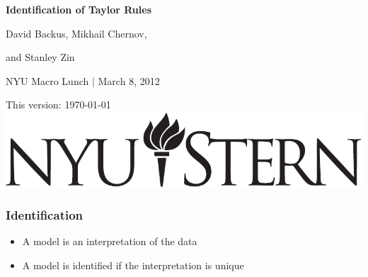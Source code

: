 \documentclass{beamer}
\title[Identification]{}
\author[Backus, Chernov, \& Zin]{}
\institute[NYU, LSE]{}
\date[]{\today}
\begin{document}
\vspace*{0.85in}
\centerline{\Large\bf Identification of Taylor Rules}

\bigskip\bigskip\bigskip\medskip
\centerline{David Backus, Mikhail Chernov,}
\centerline{and Stanley Zin}

\bigskip\medskip\medskip\medskip
\centerline{NYU Macro Lunch $|$ March 8, 2012}

\vfill
{\tiny \hspace{7pt}This version: \today}
{\hfill \includegraphics[scale=0.25]{stern_logo3.pdf}}

\begin{frame}
\frametitle{Identification}
\begin{itemize} \itemsep=\bigskipamount
\item A model is an interpretation of the data
\item A model is identified if the interpretation is unique
\end{itemize}
\end{frame}
\end{document}
